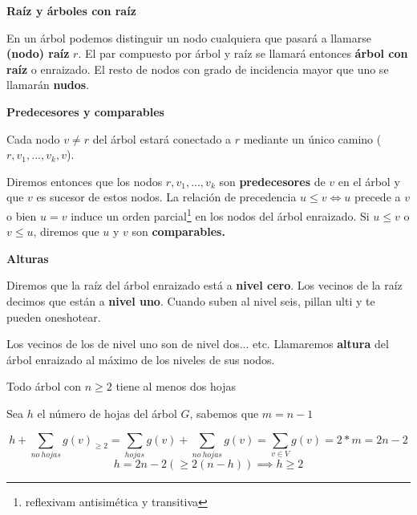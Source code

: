 \documentclass[openany]{book}
\begin{document}
\begin{definition}
  { \color{turquoise} \textbf{Raíz y árboles con raíz}}

  En un árbol podemos distinguir un nodo cualquiera que pasará a llamarse \textbf{(nodo) raíz} $r$. El par compuesto por árbol y raíz se llamará entonces \textbf{árbol con raíz} o enraizado. El resto de nodos con grado de incidencia mayor que uno se llamarán \textbf{nudos}.
\end{definition}

\begin{definition}
  { \color{turquoise} \textbf{Predecesores y comparables}}

  Cada nodo $ v \ne r $ del árbol estará conectado a $ r $ mediante un único camino ($ r,v_1,...,v_k,v $).

  Diremos entonces que los nodos $ r,v_1,...,v_k $ son \textbf{predecesores} de $ v $ en el árbol y que $ v $ es sucesor de estos nodos. La relación de precedencia $ u \leq v \iff u $ precede a $ v $ o bien $ u = v $ induce un orden parcial\footnote{reflexivam antisimética y transitiva} en los nodos del árbol enraizado. Si $ u \leq v $ o $ v \leq u $, diremos que $ u $ y $ v $ son \textbf{comparables.}
\end{definition}

\begin{definition}
  { \color{turquoise} \textbf{Alturas}}

  Diremos que la raíz del árbol enraizado está a \textbf{nivel cero}. Los vecinos de la raíz decimos que están a \textbf{nivel uno}. Cuando suben al nivel seis, pillan ulti y te pueden oneshotear.

  Los vecinos de los de nivel uno son de nivel dos... etc. Llamaremos \textbf{altura} del árbol enraizado al máximo de los niveles de sus nodos.
\end{definition}



\begin{proposition}
  Todo árbol con $ n \geq 2 $ tiene al menos dos hojas
\end{proposition}

\begin{demonstration}
  Sea $ h $ el número de hojas del árbol $ G $, sabemos que $ m = n-1 $


  $$h + \sum_{no\ hojas} g(v)_{\geq 2} = \sum_{hojas} g(v) + \sum_{no\ hojas} g(v)  = \sum_{v \in V} {g(v)} = 2*m = 2n-2 $$
  $$ h = 2n-2 (\geq 2(n-h)) \implies h \geq 2 $$
\end{demonstration}
\end{document}
